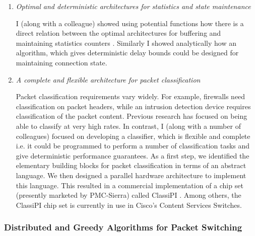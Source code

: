 \documentclass[a4paper, 12pt]{article}
\begin{document}
\begin{small}
\begin{enumerate}
\item {\em Optimal and deterministic architectures for statistics and state maintenance}

I (along with a colleague) showed using potential functions how there is
a direct relation between the optimal architectures for buffering
and maintaining statistics counters \cite{stats}.
Similarly I showed analytically how an algorithm, which gives deterministic
delay bounds could be designed for maintaining connection state.

\item {\em A complete and flexible architecture for packet classification}



Packet classification requirements vary widely.
For example, firewalls need classification on packet headers, while an
intrusion detection device requires classification of the packet content.
Previous research has focused on being able to classify at very
high rates. In contrast, I (along with a number of colleagues)
focused on developing a classifier, which is flexible and complete i.e. it could be programmed to
perform a number of classification tasks and give deterministic performance guarantees.
As a first step, we identified the elementary building blocks for packet
classification in terms of an abstract language. We then designed a parallel hardware architecture
to implement this
language. This resulted in a commercial implementation of a chip set
(presently marketed by PMC-Sierra) called ClassiPI \cite{classipi}.
Among others, the ClassiPI chip set is currently in use in Cisco's
Content Services Switches.


\end{enumerate}

\subsubsection*{\small Distributed and Greedy Algorithms for Packet Switching}



\end{small}
\end{document}
